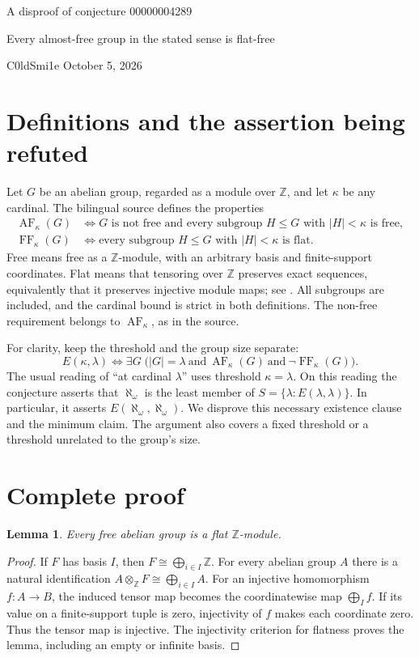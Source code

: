 \documentclass[11pt]{article}
\newtheorem{lemma}{Lemma}
\newcommand{\AF}{\operatorname{AF}}
\newcommand{\FF}{\operatorname{FF}}
\begin{document}
\begin{center}
{\LARGE A disproof of conjecture 00000004289\par}
\vspace{5pt}
{\large Every almost-free group in the stated sense is flat-free\par}
\vspace{10pt}
C0ldSmi1e \quad\textbullet\quad October 5, 2026
\end{center}

\section{Definitions and the assertion being refuted}
Let $G$ be an abelian group, regarded as a module over $\mathbb Z$, and let
$\kappa$ be any cardinal. The bilingual source defines the properties
\begin{align*}
 \AF_\kappa(G)&\iff G\text{ is not free and every subgroup }H\leq G
                 \text{ with }|H|<\kappa\text{ is free},\\
 \FF_\kappa(G)&\iff \text{every subgroup }H\leq G
                 \text{ with }|H|<\kappa\text{ is flat}.
\end{align*}
Free means free as a $\mathbb Z$-module, with an arbitrary basis and
finite-support coordinates. Flat means that tensoring over $\mathbb Z$
preserves exact sequences, equivalently that it preserves injective module
maps; see \cite{stacks}. All subgroups are included, and the cardinal bound
is strict in both definitions. The non-free requirement belongs to
$\AF_\kappa$, as in the source.

For clarity, keep the threshold and the group size separate:
\[
 E(\kappa,\lambda)\iff
 \exists G\;\bigl(|G|=\lambda\ \text{and}\
 \AF_\kappa(G)\ \text{and}\ \neg\FF_\kappa(G)\bigr).
\]
The usual reading of ``at cardinal $\lambda$'' uses threshold
$\kappa=\lambda$. On this reading the conjecture asserts that
$\aleph_\omega$ is the least member of
$S=\{\lambda:E(\lambda,\lambda)\}$.
In particular, it asserts $E(\aleph_\omega,\aleph_\omega)$.
We disprove this necessary existence clause and the minimum claim.
The argument also covers a fixed threshold or a threshold unrelated to the
group's size.

\section{Complete proof}
\begin{lemma}
Every free abelian group is a flat $\mathbb Z$-module.
\end{lemma}
\begin{proof}
If $F$ has basis $I$, then $F\cong\bigoplus_{i\in I}\mathbb Z$.
For every abelian group $A$ there is a natural identification
$A\otimes_{\mathbb Z}F\cong\bigoplus_{i\in I}A$.
For an injective homomorphism $f:A\to B$, the induced tensor map becomes
the coordinatewise map $\bigoplus_I f$. If its value on a finite-support
tuple is zero, injectivity of $f$ makes each coordinate zero. Thus the
tensor map is injective. The injectivity criterion for flatness proves
the lemma, including an empty or infinite basis.
\end{proof}
\end{document}
